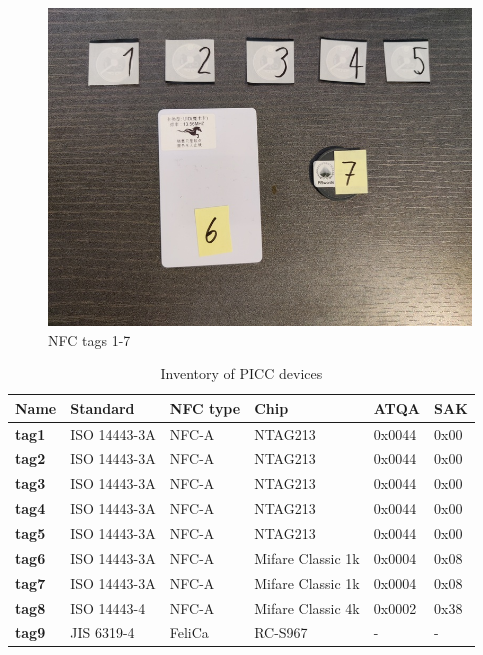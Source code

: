 \begin{figure}[htp!]
  \centering
  \includegraphics[scale=0.25]{figures/data_standard-tags2.jpg}
  \caption{NFC tags 1-7}
  \label{fig:tags}
\end{figure}

\begin{table}[h!]
  \centering
  \begin{tabular}{|l|l|l|l|l|l|}
    \hline
    \textbf{Name} & \textbf{Standard} & \textbf{NFC type} & \textbf{Chip}     & \textbf{ATQA} & \textbf{SAK} \\ \hline
    \textbf{tag1} & ISO 14443-3A      & NFC-A             & NTAG213           & 0x0044        & 0x00         \\ \hline
    \textbf{tag2} & ISO 14443-3A      & NFC-A             & NTAG213           & 0x0044        & 0x00         \\ \hline
    \textbf{tag3} & ISO 14443-3A      & NFC-A             & NTAG213           & 0x0044        & 0x00         \\ \hline
    \textbf{tag4} & ISO 14443-3A      & NFC-A             & NTAG213           & 0x0044        & 0x00         \\ \hline
    \textbf{tag5} & ISO 14443-3A      & NFC-A             & NTAG213           & 0x0044        & 0x00         \\ \hline \hline
    \textbf{tag6} & ISO 14443-3A      & NFC-A             & Mifare Classic 1k & 0x0004        & 0x08         \\ \hline
    \textbf{tag7} & ISO 14443-3A      & NFC-A             & Mifare Classic 1k & 0x0004        & 0x08         \\ \hline
    \textbf{tag8} & ISO 14443-4       & NFC-A             & Mifare Classic 4k & 0x0002        & 0x38         \\ \hline
    \textbf{tag9} & JIS 6319-4        & FeliCa            & RC-S967           & -             & -            \\ \hline
  \end{tabular}
  \caption{Inventory of PICC devices}
  \label{tab:picc-inventory}
\end{table}


